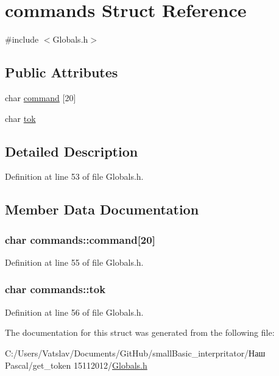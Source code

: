 \hypertarget{structcommands}{\section{commands Struct Reference}
\label{structcommands}
}


{\ttfamily \#include $<$Globals.\-h$>$}

\subsection*{Public Attributes}
\begin{DoxyCompactItemize}
\item 
char \hyperlink{structcommands_a8a9b33c07bbe0d690879af7acc1e0c67}{command} \mbox{[}20\mbox{]}
\item 
char \hyperlink{structcommands_a142499c28c9e2b02a0cc72bd9f325a00}{tok}
\end{DoxyCompactItemize}


\subsection{Detailed Description}


Definition at line 53 of file Globals.\-h.



\subsection{Member Data Documentation}
\hypertarget{structcommands_a8a9b33c07bbe0d690879af7acc1e0c67}{
\subsubsection[{command}]{\setlength{\rightskip}{0pt plus 5cm}char commands\-::command\mbox{[}20\mbox{]}}}\label{structcommands_a8a9b33c07bbe0d690879af7acc1e0c67}


Definition at line 55 of file Globals.\-h.

\hypertarget{structcommands_a142499c28c9e2b02a0cc72bd9f325a00}{
\subsubsection[{tok}]{\setlength{\rightskip}{0pt plus 5cm}char commands\-::tok}}\label{structcommands_a142499c28c9e2b02a0cc72bd9f325a00}


Definition at line 56 of file Globals.\-h.



The documentation for this struct was generated from the following file\-:\begin{DoxyCompactItemize}
\item 
C\-:/\-Users/\-Vatslav/\-Documents/\-Git\-Hub/small\-Basic\-\_\-interpritator/Наш Pascal/get\-\_\-token 15112012/\hyperlink{_globals_8h}{Globals.\-h}\end{DoxyCompactItemize}
